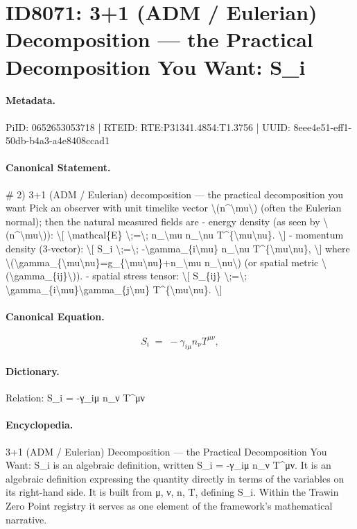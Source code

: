 \section*{ID8071: 3+1 (ADM / Eulerian) Decomposition — the Practical Decomposition You Want: S\_i}
\paragraph{Metadata.}
PiID: 0652653053718 | RTEID: RTE:P31341.4854:T1.3756 | UUID: 8eee4e51-eff1-50db-b4a3-a4e8408ccad1

\paragraph{Canonical Statement.}
\# 2) 3+1 (ADM / Eulerian) decomposition — the practical decomposition you want Pick an observer with unit timelike vector \textbackslash{}(n\textasciicircum{}\textbackslash{}mu\textbackslash{}) (often the Eulerian normal); then the natural measured fields are - energy density (as seen by \textbackslash{}(n\textasciicircum{}\textbackslash{}mu\textbackslash{})): \textbackslash{}[ \textbackslash{}mathcal\{E\} \textbackslash{};=\textbackslash{}; n\_\textbackslash{}mu n\_\textbackslash{}nu T\textasciicircum{}\{\textbackslash{}mu\textbackslash{}nu\}. \textbackslash{}] - momentum density (3-vector): \textbackslash{}[ S\_i \textbackslash{};=\textbackslash{}; -\textbackslash{}gamma\_\{i\textbackslash{}mu\} n\_\textbackslash{}nu T\textasciicircum{}\{\textbackslash{}mu\textbackslash{}nu\}, \textbackslash{}] where \textbackslash{}(\textbackslash{}gamma\_\{\textbackslash{}mu\textbackslash{}nu\}=g\_\{\textbackslash{}mu\textbackslash{}nu\}+n\_\textbackslash{}mu n\_\textbackslash{}nu\textbackslash{}) (or spatial metric \textbackslash{}(\textbackslash{}gamma\_\{ij\}\textbackslash{})). - spatial stress tensor: \textbackslash{}[ S\_\{ij\} \textbackslash{};=\textbackslash{}; \textbackslash{}gamma\_\{i\textbackslash{}mu\}\textbackslash{}gamma\_\{j\textbackslash{}nu\} T\textasciicircum{}\{\textbackslash{}mu\textbackslash{}nu\}. \textbackslash{}]

\paragraph{Canonical Equation.}
\[
S_i \;=\; -\gamma_{i\mu} n_\nu T^{\mu\nu},
\]

\paragraph{Dictionary.}
Relation: S\_i = -γ\_iμ n\_ν T\textasciicircum{}μν

\paragraph{Encyclopedia.}
3+1 (ADM / Eulerian) Decomposition — the Practical Decomposition You Want: S\_i is an algebraic definition, written S\_i = -γ\_iμ n\_ν T\textasciicircum{}μν. It is an algebraic definition expressing the quantity directly in terms of the variables on its right-hand side. It is built from μ, ν, n, T, defining S\_i. Within the Trawin Zero Point registry it serves as one element of the framework's mathematical narrative.
